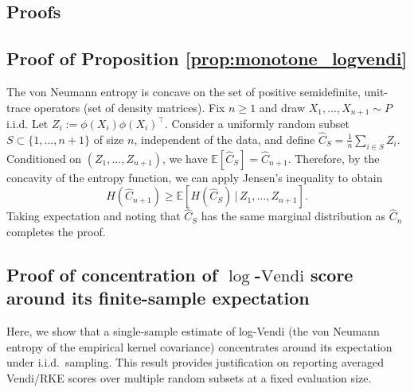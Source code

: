 \documentclass{article}
\theoremstyle{plain}
\theoremstyle{definition}
\begin{document}
\clearpage




 \begin{appendices}
\section{Proofs}
\subsection{Proof of Proposition \ref{prop:monotone_logvendi}}

The von Neumann entropy is concave on the set of positive semidefinite, unit-trace operators (set of density matrices).
Fix $n\ge 1$ and draw $X_1,\ldots,X_{n+1}\sim P$ i.i.d.
Let $Z_i:=\phi(X_i)\phi(X_i)^\top$.
Consider a uniformly random subset $S\subset\{1,\ldots,n+1\}$ of size $n$, independent of the data, and define
$\widehat{C}_S=\frac{1}{n}\sum_{i\in S} Z_i$.
Conditioned on $(Z_1,\ldots,Z_{n+1})$, we have
$\mathbb{E}[\widehat{C}_S]=\widehat{C}_{n+1}$.
Therefore, by the concavity of the entropy function, we can apply Jensen's inequality to obtain
\[
H(\widehat{C}_{n+1})
\ge
\mathbb{E}\left[H(\widehat{C}_S)\,\big|\, Z_1,\ldots,Z_{n+1}\right].
\]
Taking expectation and noting that $\widehat{C}_S$ has the same marginal distribution as $\widehat{C}_n$ completes the proof.


\subsection{Proof of concentration of $\log$-$\mathrm{Vendi}$ score around its finite-sample expectation}


Here, we show that a single-sample estimate of log-Vendi (the von Neumann entropy of the empirical
kernel covariance) concentrates around its expectation under i.i.d.\ sampling. This result provides justification on
reporting averaged Vendi/RKE scores over multiple random subsets at a fixed evaluation size.


\end{appendices}
\end{document}
